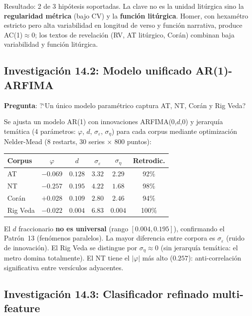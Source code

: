 \documentclass[12pt,a4paper]{article}
\begin{document}
\noindent
Resultado: 2 de 3 hip\'otesis soportadas. La clave no es la unidad lit\'urgica
sino la \textbf{regularidad m\'etrica} (bajo CV) y la \textbf{funci\'on lit\'urgica}.
Homer, con hexam\'etro estricto pero alta variabilidad en longitud de verso y
funci\'on narrativa, produce AC(1)$\approx 0$; los textos de revelaci\'on
(RV, AT lit\'urgico, Cor\'an) combinan baja variabilidad y funci\'on lit\'urgica.

\subsection{Investigaci\'on 14.2: Modelo unificado AR(1)-ARFIMA}

\textbf{Pregunta}: ?`Un \'unico modelo param\'etrico captura AT, NT, Cor\'an y Rig Veda?

Se ajusta un modelo AR(1) con innovaciones ARFIMA(0,$d$,0) y jerarqu\'ia tem\'atica
(4 par\'ametros: $\varphi$, $d$, $\sigma_\varepsilon$, $\sigma_\eta$) para cada corpus
mediante optimizaci\'on Nelder-Mead (8 restarts, 30 series $\times$ 800 puntos):

\begin{center}
\begin{tabular}{lccccc}
\toprule
\textbf{Corpus} & $\varphi$ & $d$ & $\sigma_\varepsilon$ & $\sigma_\eta$ & \textbf{Retrodic.} \\
\midrule
AT       & $-0.069$ & $0.128$ & $3.32$ & $2.29$ & 92\% \\
NT       & $-0.257$ & $0.195$ & $4.22$ & $1.68$ & 98\% \\
Cor\'an  & $+0.028$ & $0.109$ & $2.80$ & $2.46$ & 94\% \\
Rig Veda & $-0.022$ & $0.004$ & $6.83$ & $0.004$ & 100\% \\
\bottomrule
\end{tabular}
\end{center}

\noindent
El $d$ fraccionario \textbf{no es universal} (rango $[0.004, 0.195]$), confirmando
el Patr\'on~13 (fen\'omenos paralelos). La mayor diferencia entre corpora es
$\sigma_\varepsilon$ (ruido de innovaci\'on). El Rig Veda se distingue por
$\sigma_\eta \approx 0$ (sin jerarqu\'ia tem\'atica: el metro domina totalmente).
El NT tiene el $|\varphi|$ m\'as alto ($0.257$): anti-correlaci\'on significativa
entre vers\'iculos adyacentes.

\subsection{Investigaci\'on 14.3: Clasificador refinado multi-feature}
\end{document}

